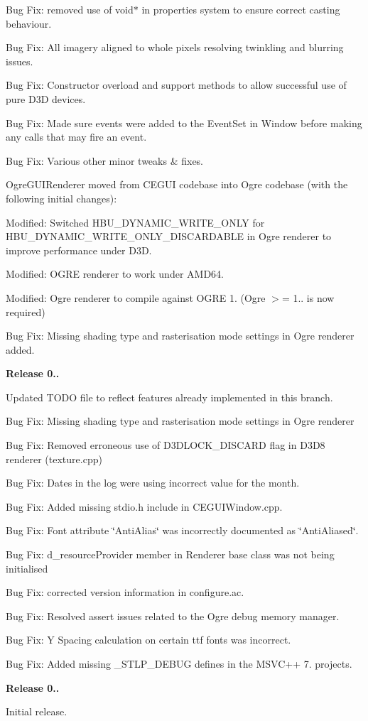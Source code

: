 \begin{DoxyItemize}
\item Bug Fix\+: removed use of void$\ast$ in properties system to ensure correct casting behaviour.
\item Bug Fix\+: All imagery aligned to whole pixels resolving twinkling and blurring issues.
\item Bug Fix\+: Constructor overload and support methods to allow successful use of \textquotesingle{}pure\textquotesingle{} D3D devices.
\item Bug Fix\+: Made sure events were added to the Event\+Set in Window before making any calls that may fire an event.
\item Bug Fix\+: Various other minor tweaks \& fixes.
\item Ogre\+G\+U\+I\+Renderer moved from C\+E\+G\+UI codebase into Ogre codebase (with the following initial changes)\+:
\item Modified\+: Switched H\+B\+U\+\_\+\+D\+Y\+N\+A\+M\+I\+C\+\_\+\+W\+R\+I\+T\+E\+\_\+\+O\+N\+LY for H\+B\+U\+\_\+\+D\+Y\+N\+A\+M\+I\+C\+\_\+\+W\+R\+I\+T\+E\+\_\+\+O\+N\+L\+Y\+\_\+\+D\+I\+S\+C\+A\+R\+D\+A\+B\+LE in Ogre renderer to improve performance under D3D.
\item Modified\+: O\+G\+RE renderer to work under A\+M\+D64.
\item Modified\+: Ogre renderer to compile against O\+G\+RE 1. (Ogre $>$= 1.. is now required)
\item Bug Fix\+: Missing shading type and rasterisation mode settings in Ogre renderer added.
\end{DoxyItemize}

{\bfseries{Release 0..}}
\begin{DoxyItemize}
\item Updated T\+O\+DO file to reflect features already implemented in this branch.
\item Bug Fix\+: Missing shading type and rasterisation mode settings in Ogre renderer
\item Bug Fix\+: Removed erroneous use of D3\+D\+L\+O\+C\+K\+\_\+\+D\+I\+S\+C\+A\+RD flag in D3\+D8 renderer (texture.\+cpp)
\item Bug Fix\+: Dates in the log were using incorrect value for the month.
\item Bug Fix\+: Added missing stdio.\+h include in C\+E\+G\+U\+I\+Window.\+cpp.
\item Bug Fix\+: Font attribute \char`\"{}\+Anti\+Alias\char`\"{} was incorrectly documented as \char`\"{}\+Anti\+Aliased\char`\"{}.
\item Bug Fix\+: d\+\_\+resource\+Provider member in Renderer base class was not being initialised
\item Bug Fix\+: corrected version information in configure.\+ac.
\item Bug Fix\+: Resolved assert issues related to the Ogre debug memory manager.
\item Bug Fix\+: Y Spacing calculation on certain ttf fonts was incorrect.
\item Bug Fix\+: Added missing \+\_\+\+S\+T\+L\+P\+\_\+\+D\+E\+B\+UG defines in the M\+S\+V\+C++ 7. projects.
\end{DoxyItemize}

{\bfseries{Release 0..}}
\begin{DoxyItemize}
\item Initial release. 
\end{DoxyItemize}